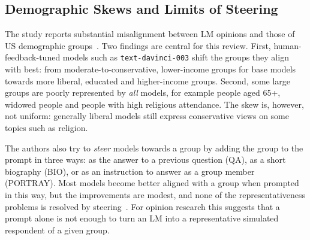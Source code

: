 \subsection{Demographic Skews and Limits of Steering}
The study reports substantial misalignment between LM opinions and those of US demographic groups~\cite{santurkar2023whose}. Two findings are central for this review. First, human-feedback-tuned models such as \texttt{text-davinci-003} shift the groups they align with best: from moderate-to-conservative, lower-income groups for base models towards more liberal, educated and higher-income groups. Second, some large groups are poorly represented by \emph{all} models, for example people aged 65+, widowed people and people with high religious attendance. The skew is, however, not uniform: generally liberal models still express conservative views on some topics such as religion. %

The authors also try to \emph{steer} models towards a group by adding the group to the prompt in three ways: as the answer to a previous question (QA), as a short biography (BIO), or as an instruction to answer as a group member (PORTRAY). Most models become better aligned with a group when prompted in this way, but the improvements are modest, and none of the representativeness problems is resolved by steering~\cite{santurkar2023whose}. %
For opinion research this suggests that a prompt alone is not enough to turn an LM into a representative simulated respondent of a given group.
